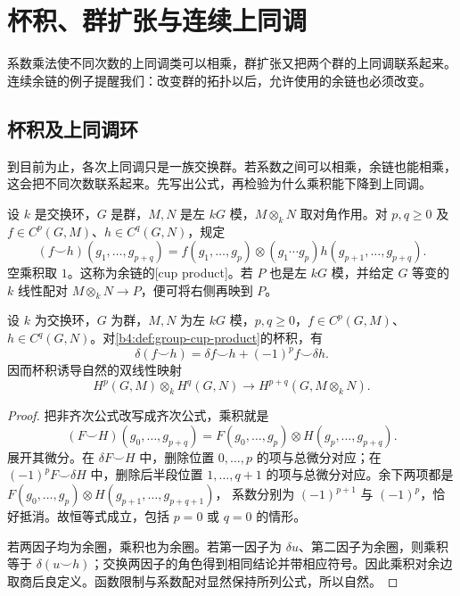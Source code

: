 
\section{杯积、群扩张与连续上同调}
\label{b4:sec:1104}

系数乘法使不同次数的上同调类可以相乘，群扩张又把两个群的上同调联系起来。连续余链的例子提醒我们：改变群的拓扑以后，允许使用的余链也必须改变。

%
%
%

\subsection{杯积及上同调环}
\label{b4:subsec:1104:01}

到目前为止，各次上同调只是一族交换群。若系数之间可以相乘，余链也能相乘，这会把不同次数联系起来。先写出公式，再检验为什么乘积能下降到上同调。

\begin{definition}\label{b4:def:group-cup-product}
设 \(k\) 是交换环，\(G\) 是群，\(M,N\) 是左 \(kG\) 模，\(M\otimes_kN\) 取对角作用。对 \(p,q\ge0\) 及 \(f\in C^p(G,M)\)、\(h\in C^q(G,N)\)，规定
\[
(f\smile h)(g_1,\ldots,g_{p+q})
=f(g_1,\ldots,g_p)\otimes
(g_1\cdots g_p)h(g_{p+1},\ldots,g_{p+q}).
\]
空乘积取 \(1\)。这称为余链的[cup product]。若 \(P\) 也是左 \(kG\) 模，并给定 \(G\) 等变的 \(k\) 线性配对 \(M\otimes_kN\to P\)，便可将右侧再映到 \(P\)。
\end{definition}

\begin{proposition}\label{b4:prop:group-cup-leibniz}
设 \(k\) 为交换环，\(G\) 为群，\(M,N\) 为左 \(kG\) 模，\(p,q\ge0\)，\(f\in C^p(G,M)\)、\(h\in C^q(G,N)\)。对\cref{b4:def:group-cup-product}的杯积，有
\[
\delta(f\smile h)=\delta f\smile h+(-1)^p f\smile\delta h.
\]
因而杯积诱导自然的双线性映射
\[
H^p(G,M)\otimes_kH^q(G,N)
\longrightarrow H^{p+q}(G,M\otimes_kN).
\]
\end{proposition}
\begin{proof}
把非齐次公式改写成齐次公式，乘积就是
\[
(F\smile H)(g_0,\ldots,g_{p+q})
=F(g_0,\ldots,g_p)\otimes H(g_p,\ldots,g_{p+q}).
\]
展开其微分。在 \(\delta F\smile H\) 中，删除位置 \(0,\ldots,p\) 的项与总微分对应；在 \((-1)^pF\smile\delta H\) 中，删除后半段位置 \(1,\ldots,q+1\) 的项与总微分对应。余下两项都是
\(F(g_0,\ldots,g_p)\otimes H(g_{p+1},\ldots,g_{p+q+1})\)，
系数分别为 \((-1)^{p+1}\) 与 \((-1)^p\)，恰好抵消。故恒等式成立，包括 \(p=0\) 或 \(q=0\) 的情形。

若两因子均为余圈，乘积也为余圈。若第一因子为 \(\delta u\)、第二因子为余圈，则乘积等于 \(\delta(u\smile h)\)；交换两因子的角色得到相同结论并带相应符号。因此乘积对余边取商后良定义。函数限制与系数配对显然保持所列公式，所以自然。
\end{proof}

